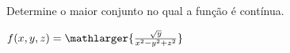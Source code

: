 
Determine o maior conjunto no qual a função é contínua.


$ f(x,y,z)=\mathlarger{\frac{\sqrt y}{x^2-y^2+z^2}}$